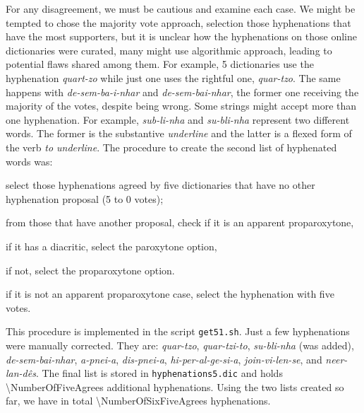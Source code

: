 \documentclass{article}
\begin{document}
For any disagreement, we must be cautious and examine each case.
We might be tempted to chose the majority vote approach, selection
those hyphenations that have the most supporters, but it is unclear 
how the hyphenations on those online dictionaries were curated, 
many might use algorithmic approach, leading to potential flaws shared
among them. 
For example, 5 dictionaries use the hyphenation 
\emph{quart-zo} while just one uses the rightful one, \emph{quar-tzo}.
The same happens with \emph{de-sem-ba-i-nhar} and \emph{de-sem-bai-nhar},
the former one receiving the majority of the votes, despite being wrong.
Some strings might accept more than one hyphenation. For example, 
\emph{sub-li-nha} and \emph{su-bli-nha} represent two different words.
The former is the substantive \emph{underline} and the latter is a flexed form of the verb \emph{to underline}.
The procedure to create the second list of hyphenated words was:
\begin{enumerate*}[label=\arabic*)]
  \item select those hyphenations agreed by five dictionaries that have no other hyphenation proposal (5 to 0 votes);
  \item from those that have another proposal, check if it is an apparent proparoxytone,
      \begin{enumerate*}[label=\alph*)]
	  \item if it has a diacritic, select the paroxytone option,
	  \item if not, select the proparoxytone option.
      \end{enumerate*}
  \item if it is not an apparent proparoxytone case, select the hyphenation with five votes.
\end{enumerate*}
This procedure is implemented in the script \texttt{get51.sh}.
Just a few hyphenations were manually corrected. They are: \emph{quar-tzo}, 
\emph{quar-tzi-to}, \emph{su-bli-nha} (was added), \emph{de-sem-bai-nhar},
\emph{a-pnei-a}, \emph{dis-pnei-a}, \emph{hi-per-al-ge-si-a}, \emph{join-vi-len-se}, and \emph{neer-lan-dês}.
The final list is stored in \texttt{hyphenations5.dic} and holds \num{\NumberOfFiveAgrees} additional hyphenations.
Using the two lists created so far, we have in total \num{\NumberOfSixFiveAgrees} hyphenations.
\end{document}
